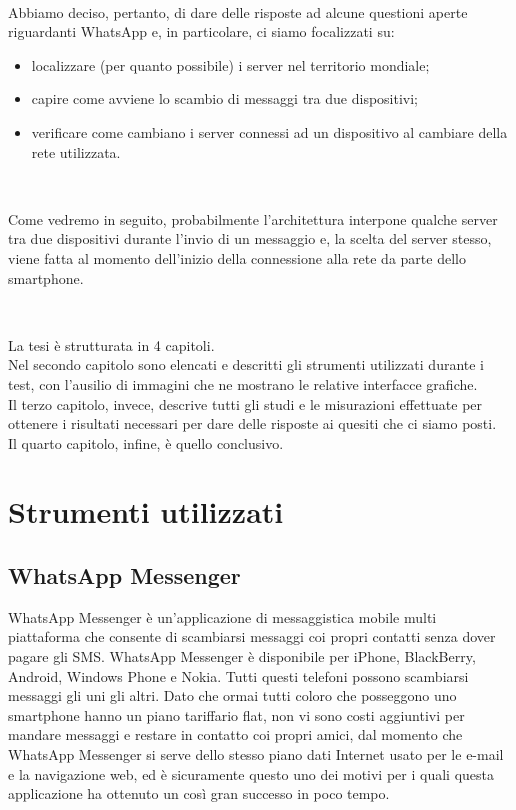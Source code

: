 \documentclass[a4paper,11pt]{book}
\begin{document}
~

Abbiamo deciso, pertanto, di dare delle risposte ad alcune questioni aperte riguardanti WhatsApp e, in particolare, ci siamo focalizzati su:
\begin{itemize}
 \item localizzare (per quanto possibile) i server nel territorio mondiale;
 \item capire come avviene lo scambio di messaggi tra due dispositivi;
 \item verificare come cambiano i server connessi ad un dispositivo al cambiare della rete utilizzata.
\end{itemize}

~

Come vedremo in seguito, probabilmente l'architettura interpone qualche server tra due dispositivi durante l'invio di un messaggio e, la scelta del server stesso, viene fatta al momento dell'inizio della connessione alla rete da parte dello smartphone.

~

La tesi \`e strutturata in 4 capitoli.\\
Nel secondo capitolo sono elencati e descritti gli strumenti utilizzati durante i test, con l'ausilio di immagini che ne mostrano le relative interfacce grafiche. \\
Il terzo capitolo, invece, descrive tutti gli studi e le misurazioni effettuate per ottenere i risultati necessari per dare delle risposte ai quesiti che ci siamo posti.\\
Il quarto capitolo, infine, \`e quello conclusivo.

\chapter{Strumenti utilizzati}

\section{WhatsApp Messenger}
WhatsApp Messenger \`e un'applicazione di messaggistica mobile multi piattaforma che consente di scambiarsi messaggi coi propri contatti senza dover pagare gli SMS. WhatsApp Messenger \`e disponibile per iPhone, BlackBerry, Android, Windows Phone e Nokia. Tutti questi telefoni possono scambiarsi messaggi gli uni gli altri. Dato che ormai tutti coloro che posseggono uno smartphone hanno un piano tariffario flat, non vi sono costi aggiuntivi per mandare messaggi e restare in contatto coi propri amici, dal momento che WhatsApp Messenger si serve dello stesso piano dati Internet usato per le e-mail e la navigazione web, ed \`e sicuramente questo uno dei motivi per i quali questa applicazione ha ottenuto un cos\`i gran successo in poco tempo.
\end{document}
